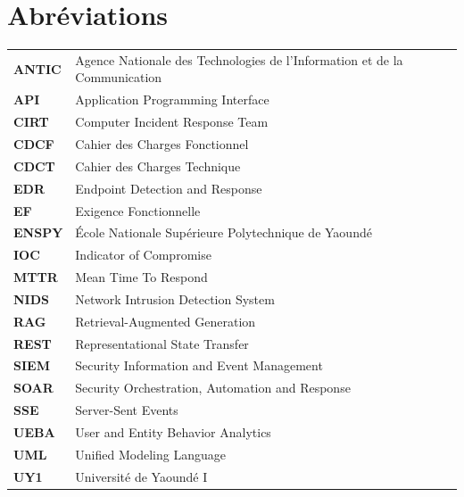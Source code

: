 \chapter*{Abr\'eviations}
\begin{table}[H]
    \centering
    \begin{tabular}{p{2.2cm} p{11cm}}
        \textbf{ANTIC} & Agence Nationale des Technologies de l'Information et de la Communication \\
        \textbf{API}   & Application Programming Interface \\
        \textbf{CIRT}  & Computer Incident Response Team \\
        \textbf{CDCF}  & Cahier des Charges Fonctionnel \\
        \textbf{CDCT}  & Cahier des Charges Technique \\
        \textbf{EDR}   & Endpoint Detection and Response \\
        \textbf{EF}    & Exigence Fonctionnelle \\
        \textbf{ENSPY} & \'Ecole Nationale Sup\'erieure Polytechnique de Yaound\'e \\
        \textbf{IOC}   & Indicator of Compromise \\
        \textbf{MTTR}  & Mean Time To Respond \\
        \textbf{NIDS}  & Network Intrusion Detection System \\
        \textbf{RAG}   & Retrieval-Augmented Generation \\
        \textbf{REST}  & Representational State Transfer \\
        \textbf{SIEM}  & Security Information and Event Management \\
        \textbf{SOAR}  & Security Orchestration, Automation and Response \\
        \textbf{SSE}   & Server-Sent Events \\
        \textbf{UEBA}  & User and Entity Behavior Analytics \\
        \textbf{UML}   & Unified Modeling Language \\
        \textbf{UY1}   & Universit\'e de Yaound\'e I \\
    \end{tabular}
\end{table}

\newpage

